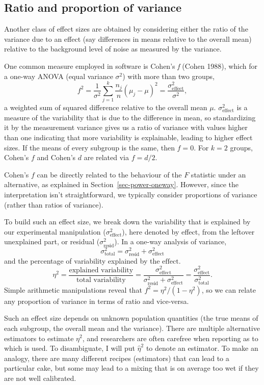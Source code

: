 \documentclass[
  11pt,
  letterpaper,
]{scrbook}
\theoremstyle{definition}
\theoremstyle{remark}
\begin{document}
\hypertarget{ratio-and-proportion-of-variance}{%
\subsection{Ratio and proportion of
variance}\label{ratio-and-proportion-of-variance}}

Another class of effect sizes are obtained by considering either the
ratio of the variance due to an effect (say differences in means
relative to the overall mean) relative to the background level of noise
as measured by the variance.

One common measure employed in software is Cohen's \emph{f} (Cohen
1988), which for a one-way ANOVA (equal variance \(\sigma^2\)) with more
than two groups, \[
f^2 = \frac{1}{\sigma^2} \sum_{j=1}^k \frac{n_j}{n}(\mu_j - \mu)^2 = \frac{\sigma^2_{\text{effect}}}{\sigma^2},
\] a weighted sum of squared difference relative to the overall mean
\(\mu\). \(\sigma^2_{\text{effect}}\) is a measure of the variability
that is due to the difference in mean, so standardizing it by the
measurement variance gives us a ratio of variance with values higher
than one indicating that more variability is explainable, leading to
higher effect sizes. If the means of every subgroup is the same, then
\(f=0\). For \(k=2\) groups, Cohen's \(f\) and Cohen's \(d\) are related
via \(f=d/2\).

Cohen's \(f\) can be directly related to the behaviour of the \(F\)
statistic under an alternative, as explained in
Section~\ref{sec-power-oneway}. However, since the interpretation isn't
straightforward, we typically consider proportions of variance (rather
than ratios of variance).

To build such an effect size, we break down the variability that is
explained by our experimental manipulation (\(\sigma^2_\text{effect}\)),
here denoted by effect, from the leftover unexplained part, or residual
(\(\sigma^2_\text{resid}\)). In a one-way analysis of variance,
\[\sigma^2_{\text{total}} = \sigma^2_{\text{resid}} + \sigma^2_{\text{effect}}\]
and the percentage of variability explained by the \(\text{effect}\).
\[\eta^2 = \frac{\text{explained variability}}{\text{total variability}}= \frac{\sigma^2_{\text{effect}}}{\sigma^2_{\text{resid}} + \sigma^2_{\text{effect}}} = \frac{\sigma^2_{\text{effect}}}{\sigma^2_{\text{total}}}.\]
Simple arithmetic manipulations reveal that \(f^2 = \eta^2/(1-\eta^2)\),
so we can relate any proportion of variance in terms of ratio and
vice-versa.

Such an effect size depends on unknown population quantities (the true
means of each subgroup, the overall mean and the variance). There are
multiple alternative estimators to estimate \(\eta^2\), and researchers
are often carefree when reporting as to which is used. To disambiguate,
I will put \(\hat{\eta}^2\) to denote an estimator. To make an analogy,
there are many different recipes (estimators) that can lead to a
particular cake, but some may lead to a mixing that is on average too
wet if they are not well calibrated.
\end{document}
